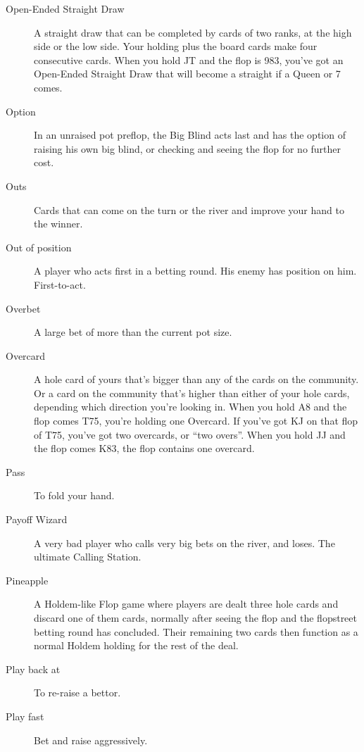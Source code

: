 \begin{description}
\item[Open-Ended Straight Draw] A straight draw that can be completed
by cards of two ranks, at the high side or the low side. Your holding
plus the board cards make four consecutive cards. When you hold JT
and the flop is 983, you've got an Open-Ended Straight Draw that will
become a straight if a Queen or 7 comes.

\item[Option] In an unraised pot preflop, the Big Blind acts last and
has the option of raising his own big blind, or checking and
seeing the flop for no further cost.

\item[Outs] Cards that can come on the turn or the river and improve
your hand to the winner.

\item[Out of position] A player who acts first in a betting round. His
enemy has position on him. First-to-act.

\item[Overbet] A large bet of more than the current pot size.


\item[Overcard] A hole card of yours that's bigger than any of the
cards on the community. Or a card on the community that's higher than
either of your hole cards, depending which direction you're looking
in. When you hold A8 and the flop comes T75, you're holding one
Overcard. If you've got KJ on that flop of T75, you've got two
overcards, or ``two overs''. When you hold JJ and the flop comes K83,
the flop contains one overcard.

\item[Pass] To fold your hand.

\item[Payoff Wizard] A very bad player who calls very big bets on the
river, and loses. The ultimate Calling Station.

\item[Pineapple] A Holdem-like Flop game where players are dealt three
hole cards and discard one of them cards, normally after seeing the
flop and the flopstreet betting round has concluded. Their remaining
two cards then function as a normal Holdem holding for the rest of the
deal.

\item[Play back at] To re-raise a bettor.

\item[Play fast] Bet and raise aggressively.


\end{description}
